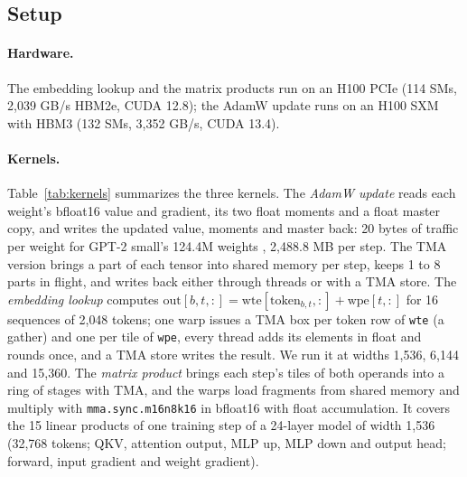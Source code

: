 \documentclass[10pt]{article}
\begin{document}
\subsection{Setup}
\label{sec:setup}

\paragraph{Hardware.}
The embedding lookup and the matrix products run on an H100 PCIe (114 SMs, 2{,}039 GB/s HBM2e, CUDA 12.8); the AdamW
update runs on an H100 SXM with HBM3 (132 SMs, 3{,}352 GB/s, CUDA 13.4).

\paragraph{Kernels.}
Table~\ref{tab:kernels} summarizes the three kernels. The \emph{AdamW update} reads each weight's bfloat16 value and
gradient, its two float moments and a float master copy, and writes the updated value, moments and master back: 20 bytes
of traffic per weight for GPT-2 small's 124.4M weights \citep{radford2019gpt2}, 2{,}488.8 MB per step. The TMA version
brings a part of each tensor into shared memory per step, keeps 1 to 8 parts in flight, and writes back either through
threads or with a TMA store. The \emph{embedding lookup} computes
$\mathrm{out}[b,t,:] = \mathrm{wte}[\mathrm{token}_{b,t},:] + \mathrm{wpe}[t,:]$ for 16 sequences of 2{,}048 tokens; one
warp issues a TMA box per token row of \texttt{wte} (a gather) and one per tile of \texttt{wpe}, every thread adds its
elements in float and rounds once, and a TMA store writes the result. We run it at widths 1{,}536, 6{,}144 and 15{,}360.
The \emph{matrix product} brings each step's tiles of both operands into a ring of stages with TMA, and the warps load
fragments from shared memory and multiply with \texttt{mma.sync.m16n8k16} in bfloat16 with float accumulation. It covers
the 15 linear products of one training step of a 24-layer model of width 1{,}536 (32{,}768 tokens; QKV, attention output,
MLP up, MLP down and output head; forward, input gradient and weight gradient).
\end{document}
